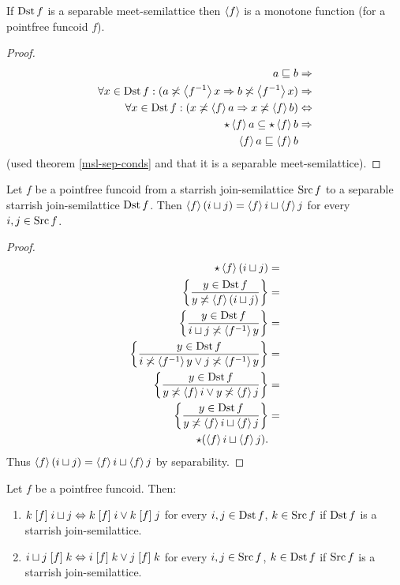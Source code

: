 \begin{prop}
\label{pfcd-mono}If $\operatorname{Dst} f$ is a separable meet-semilattice then
$\left\langle f\right\rangle$ is a monotone function (for a pointfree funcoid $f$).\end{prop}
\begin{proof}
~
\begin{align*}
a\sqsubseteq b & \Rightarrow\\
\forall x\in\operatorname{Dst} f:(a\not\asymp\left\langle f^{-1}\right\rangle x\Rightarrow b\not\asymp\left\langle f^{-1}\right\rangle x) & \Rightarrow\\
\forall x\in\operatorname{Dst} f:(x\not\asymp\left\langle f\right\rangle a\Rightarrow x\not\asymp\left\langle f\right\rangle b) & \Leftrightarrow\\
\star\left\langle f\right\rangle a\subseteq\star\left\langle f\right\rangle b & \Rightarrow\\
\left\langle f\right\rangle a\sqsubseteq\left\langle f\right\rangle b
\end{align*}
(used theorem \ref{msl-sep-conds} and that it is a separable meet-semilattice).\end{proof}
\begin{thm}
\label{pf-dist-func}Let $f$ be a pointfree funcoid from a starrish
join-semilattice $\operatorname{Src} f$ to a separable starrish join-semilattice
$\operatorname{Dst} f$. Then $\left\langle f\right\rangle(i\sqcup j)=\left\langle f\right\rangle i\sqcup\left\langle f\right\rangle j$
for every $i,j\in\operatorname{Src} f$.\end{thm}
\begin{proof}
~
\begin{align*}
\star\left\langle f\right\rangle(i\sqcup j) & =\\
\left\{ \frac{y\in\operatorname{Dst} f}{y\not\asymp\left\langle f\right\rangle(i\sqcup j)}\right\} & =\\
\left\{ \frac{y\in\operatorname{Dst} f}{i\sqcup j\not\asymp\left\langle f^{-1}\right\rangle y}\right\} & =\\
\left\{ \frac{y\in\operatorname{Dst} f}{i\not\asymp\left\langle f^{-1}\right\rangle y\lor j\not\asymp\left\langle f^{-1}\right\rangle y}\right\} & =\\
\left\{ \frac{y\in\operatorname{Dst} f}{y\not\asymp\left\langle f\right\rangle i\lor y\not\asymp\left\langle f\right\rangle j}\right\} & =\\
\left\{ \frac{y\in\operatorname{Dst} f}{y\not\asymp\left\langle f\right\rangle i\sqcup\left\langle f\right\rangle j}\right\} & =\\
\star(\left\langle f\right\rangle i\sqcup\left\langle f\right\rangle j).
\end{align*}
Thus $\left\langle f\right\rangle(i\sqcup j)=\left\langle f\right\rangle i\sqcup\left\langle f\right\rangle j$ by separability.\end{proof}
\begin{prop}
\label{pf-join-arg}Let $f$ be a pointfree funcoid. Then:\end{prop}
\begin{enumerate}
\item \label{pf-f-join-y}$k\mathrel{\left[f\right]}i\sqcup j\Leftrightarrow k\mathrel{\left[f\right]}i\lor k\mathrel{\left[f\right]}j$
for every $i,j\in\operatorname{Dst} f$, $k\in\operatorname{Src} f$ if $\operatorname{Dst} f$ is a starrish
join-semilattice.
\item \label{pf-f-join-x}$i\sqcup j\mathrel{\left[f\right]}k\Leftrightarrow i\mathrel{\left[f\right]}k\lor j\mathrel{\left[f\right]}k$
for every $i,j\in\operatorname{Src} f$, $k\in\operatorname{Dst} f$ if $\operatorname{Src} f$ is a starrish
join-semilattice.\end{enumerate}
